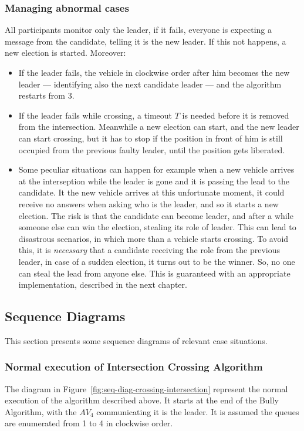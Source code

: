 \documentclass{memoir}
\begin{document}
\subsubsection{Managing abnormal cases}

All participants monitor only the leader, if it fails, everyone is expecting a message from the candidate, telling it is the new leader. If this not happens, a new election is started. Moreover:

\begin{itemize}
	\item If the leader fails, the vehicle in clockwise order after him becomes the new leader --- identifying also the next candidate leader --- and the algorithm restarts from 3.
	\item If the leader fails while crossing, a timeout $T$ is needed before it is removed from the intersection. Meanwhile a new election can start, and the new leader can start crossing, but it has to stop if the position in front of him is still occupied from the previous faulty leader, until the position gets liberated.
	\item Some peculiar situations can happen for example when a new vehicle arrives at the interseption while the leader is gone and it is passing the lead to the candidate. It the new vehicle arrives at this unfortunate moment, it could receive no answers when asking who is the leader, and so it starts a new election. The risk is that the candidate can become leader, and after a while someone else can win the election, stealing its role of leader. This can lead to disastrous scenarios, in which more than a vehicle starts crossing. To avoid this, it is \emph{necessary} that a candidate receiving the role from the previous leader, in case of a sudden election, it turns out to be the winner. So, no one can steal the lead from anyone else. This is guaranteed with an appropriate implementation, described in the next chapter.
\end{itemize}

\subsection{Sequence Diagrams}
This section presents some sequence diagrams of relevant case situations.

\subsubsection{Normal execution of Intersection Crossing Algorithm}
The diagram in Figure~\ref{fig:seq-diag-crossing-intersection} represent the normal execution of the algorithm described above. It starts at the end of the Bully Algorithm, with the $AV_4$ communicating it is the leader. It is assumed the queues are enumerated from 1 to 4 in clockwise order.
\end{document}
